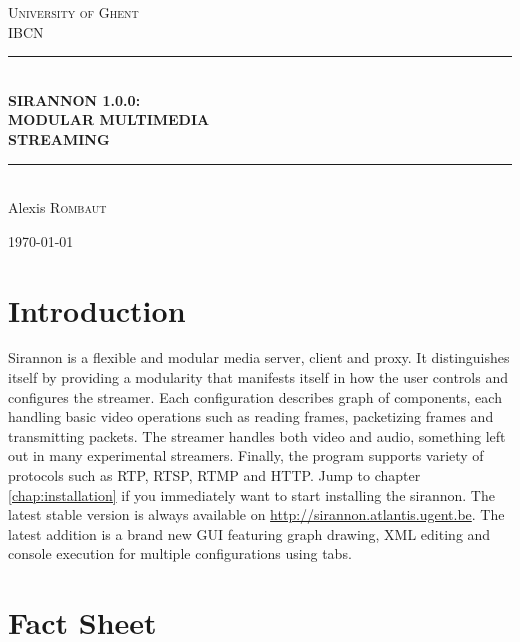 \documentclass[12pt]{report}
\begin{document}
\begin{titlepage}
\begin{center}
\textsc{\LARGE University of Ghent}\\[1.5cm] 
\textsc{\LARGE IBCN}\\[0.5cm]
\vfill  
\rule{\linewidth}{0.5mm}\\[0.5cm]
{ \huge \bfseries SIRANNON 1.0.0:}\\[0.5cm] 
{ \huge \bfseries MODULAR MULTIMEDIA}\\[0.5cm] 
{ \huge \bfseries STREAMING}\\[0.5cm] 
\rule{\linewidth}{0.5mm}\\[0.5cm]
 
 \large Alexis \textsc{Rombaut} 
\vfill
 
{\large \today}
 
\end{center} 
\end{titlepage}

\setcounter{page}{2} 
\tableofcontents
\listoffigures

\newpage
\chapter{Introduction}
Sirannon is a flexible and modular media server, client and proxy. It distinguishes itself by providing a modularity that manifests itself in how the user controls and configures the streamer. Each configuration describes graph of components, each handling basic video operations such as reading frames, packetizing frames and transmitting packets. The streamer handles both video and audio, something left out in many experimental streamers. Finally, the program supports variety of protocols such as RTP, RTSP, RTMP and HTTP. Jump to chapter \ref{chap:installation} if you immediately want to start installing the sirannon. The latest stable version is always available on \url{http://sirannon.atlantis.ugent.be}. The latest addition is a brand new GUI featuring graph drawing, XML editing and console execution for multiple configurations using tabs.

\chapter{Fact Sheet}
\end{document}
